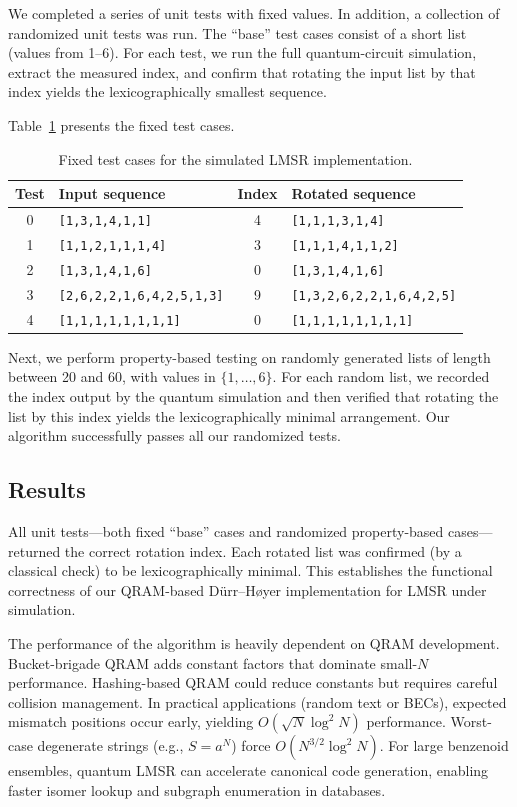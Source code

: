 \documentclass[11pt,letterpaper]{article}
\begin{document}
We completed a series of unit tests with fixed values. In addition, a collection of randomized unit tests was run. The ``base'' test cases consist of a short list (values from 1--6). For each test, we run the full quantum-circuit simulation, extract the measured index, and confirm that rotating the input list by that index yields the lexicographically smallest sequence.

Table~\ref{tab:fixed-tests} presents the fixed test cases.

\begin{table}[htbp]
\centering
\caption{Fixed test cases for the simulated LMSR implementation.}
\label{tab:fixed-tests}
\small
\begin{tabular}{@{}clcl@{}}
\toprule
Test & Input sequence & Index & Rotated sequence \\
\midrule
0 & \texttt{[1,3,1,4,1,1]} & 4 & \texttt{[1,1,1,3,1,4]} \\
1 & \texttt{[1,1,2,1,1,1,4]} & 3 & \texttt{[1,1,1,4,1,1,2]} \\
2 & \texttt{[1,3,1,4,1,6]} & 0 & \texttt{[1,3,1,4,1,6]} \\
3 & \texttt{[2,6,2,2,1,6,4,2,5,1,3]} & 9 & \texttt{[1,3,2,6,2,2,1,6,4,2,5]} \\
4 & \texttt{[1,1,1,1,1,1,1,1]} & 0 & \texttt{[1,1,1,1,1,1,1,1]} \\
\bottomrule
\end{tabular}
\end{table}

Next, we perform property-based testing on randomly generated lists of length between 20 and 60, with values in \(\{1,\dots,6\}\). For each random list, we recorded the index output by the quantum simulation and then verified that rotating the list by this index yields the lexicographically minimal arrangement. Our algorithm successfully passes all our randomized tests.

\subsection{Results}
All unit tests---both fixed ``base'' cases and randomized property-based cases---returned the correct rotation index. Each rotated list was confirmed (by a classical check) to be lexicographically minimal. This establishes the functional correctness of our QRAM-based D{\"u}rr--H{\o}yer implementation for LMSR under simulation.

The performance of the algorithm is heavily dependent on QRAM development. Bucket-brigade QRAM adds constant factors that dominate small-\(N\) performance. Hashing-based QRAM could reduce constants but requires careful collision management. In practical applications (random text or BECs), expected mismatch positions occur early, yielding \(O(\sqrt{N}\log^2 N)\) performance. Worst-case degenerate strings (e.g., \(S=a^N\)) force \(O(N^{3/2}\log^2 N)\). For large benzenoid ensembles, quantum LMSR can accelerate canonical code generation, enabling faster isomer lookup and subgraph enumeration in databases.
\end{document}
